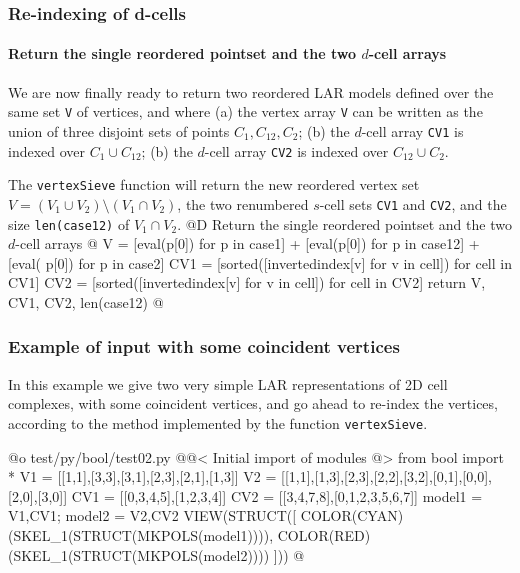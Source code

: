\documentclass[11pt,oneside]{article}	%
\begin{document}
\subsubsection{Re-indexing of d-cells}

\paragraph{Return the single reordered pointset and the two $d$-cell arrays}
We are now finally ready to return two reordered LAR models defined over the same set \texttt{V} of vertices, and where (a) the vertex array \texttt{V} can be written as the union of three disjoint sets of points $C_1,C_{12},C_2$; (b) the $d$-cell array \texttt{CV1} is indexed over $C_1\cup C_{12}$; (b) the $d$-cell array \texttt{CV2} is indexed over $C_{12}\cup C_{2}$. 

The \texttt{vertexSieve} function will return the new reordered vertex set $V = (V_1 \cup V_2) \setminus (V_1 \cap V_2)$, the two renumbered $s$-cell sets \texttt{CV1} and \texttt{CV2}, and the size \texttt{len(case12)} of $V_1 \cap V_2$.
@D Return the single reordered pointset and the two $d$-cell arrays
@{
	V = [eval(p[0]) for p in case1] + [eval(p[0]) for p in case12] + [eval(
				p[0]) for p in case2]
	CV1 = [sorted([invertedindex[v] for v in cell]) for cell in CV1]
	CV2 = [sorted([invertedindex[v] for v in cell]) for cell in CV2]
	return V, CV1, CV2, len(case12)
@}


\subsubsection{Example of input with some coincident vertices}
In this example we give two very simple LAR representations of 2D cell complexes, with some coincident vertices, and go ahead to re-index the vertices, according to the method implemented by the function \texttt{vertexSieve}.

@o test/py/bool/test02.py
@{@< Initial import of modules @>
from bool import *
V1 = [[1,1],[3,3],[3,1],[2,3],[2,1],[1,3]]
V2 = [[1,1],[1,3],[2,3],[2,2],[3,2],[0,1],[0,0],[2,0],[3,0]]
CV1 = [[0,3,4,5],[1,2,3,4]]
CV2 = [[3,4,7,8],[0,1,2,3,5,6,7]]
model1 = V1,CV1; model2 = V2,CV2
VIEW(STRUCT([ 
	COLOR(CYAN)(SKEL_1(STRUCT(MKPOLS(model1)))), 
	COLOR(RED)(SKEL_1(STRUCT(MKPOLS(model2)))) ]))
@}
\end{document}

